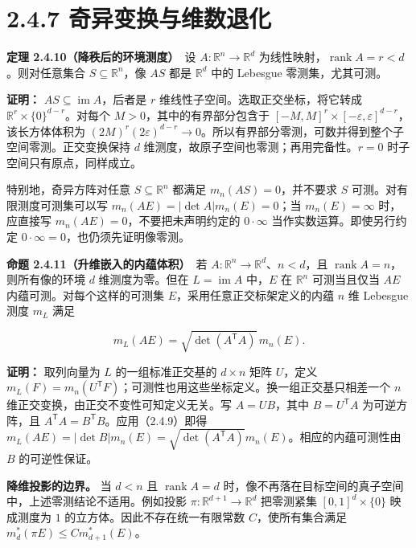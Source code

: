 \documentclass[11pt,a4paper]{article}
\begin{document}
\section[\S{}2.4.7
奇异变换与维数退化]{2.4.7
奇异变换与维数退化}\label{ux5947ux5f02ux53d8ux6362ux4e0eux7ef4ux6570ux9000ux5316}

\textbf{定理 2.4.10（降秩后的环境测度）}　设
\(A:\mathbb R^n\to\mathbb R^d\)
为线性映射，\(\operatorname{rank}A=r<d\)。则对任意集合
\(S\subseteq\mathbb R^n\)，像 \(AS\) 都是 \(\mathbb R^d\) 中的 Lebesgue
零测集，尤其可测。

\textbf{证明：} \(AS\subseteq\operatorname{im}A\)，后者是 \(r\)
维线性子空间。选取正交坐标，将它转成
\(\mathbb R^r\times\{0\}^{d-r}\)。对每个 \(M>0\)，其中的有界部分包含于
\([-M,M]^r\times[-\varepsilon,\varepsilon]^{d-r}\)，该长方体体积为
\((2M)^r(2\varepsilon)^{d-r}\to0\)。所以有界部分零测，可数并得到整个子空间零测。正交变换保持
\(d\) 维测度，故原子空间也零测；再用完备性。\(r=0\)
时子空间只有原点，同样成立。

特别地，奇异方阵对任意 \(S\subseteq\mathbb R^n\) 都满足
\(m_n(AS)=0\)，并不要求 \(S\) 可测。对有限测度可测集可以写
\(m_n(AE)=|\det A|m_n(E)=0\)；当 \(m_n(E)=\infty\) 时，应直接写
\(m_n(AE)=0\)，不要把未声明约定的 \(0\cdot\infty\)
当作实数运算。即使另行约定 \(0\cdot\infty=0\)，也仍须先证明像零测。

\textbf{命题 2.4.11（升维嵌入的内蕴体积）}　若
\(A:\mathbb R^n\to\mathbb R^d\)、\(n<d\)，且
\(\operatorname{rank}A=n\)，则所有像的环境 \(d\) 维测度为零。但在
\(L=\operatorname{im}A\) 中，\(E\) 在 \(\mathbb R^n\) 可测当且仅当
\(AE\) 内蕴可测。对每个这样的可测集 \(E\)，采用任意正交标架定义的内蕴
\(n\) 维 Lebesgue 测度 \(m_L\) 满足

\begin{equation*}
m_L(AE)=\sqrt{\det(A^{\mathsf T}A)}\,m_n(E).
\tag{2.4.16}
\end{equation*}

\textbf{证明：} 取列向量为 \(L\) 的一组标准正交基的 \(d\times n\) 矩阵
\(U\)，定义
\(m_L(F)=m_n(U^{\mathsf T}F)\)；可测性也用这些坐标定义。换一组正交基只相差一个
\(n\) 维正交变换，由正交不变性可知定义无关。写 \(A=UB\)，其中
\(B=U^{\mathsf T}A\) 为可逆方阵，且
\(A^{\mathsf T}A=B^{\mathsf T}B\)。应用（2.4.9）即得
\(m_L(AE)=|\det B|m_n(E)=\sqrt{\det(A^{\mathsf T}A)}m_n(E)\)。相应的内蕴可测性由
\(B\) 的可逆性保证。

\textbf{降维投影的边界。} 当 \(d<n\) 且 \(\operatorname{rank}A=d\)
时，像不再落在目标空间的真子空间中，上述零测结论不适用。例如投影
\(\pi:\mathbb R^{d+1}\to\mathbb R^d\) 把零测紧集 \([0,1]^d\times\{0\}\)
映成测度为 \(1\) 的立方体。因此不存在统一有限常数 \(C\)，使所有集合满足
\(m_d^*(\pi E)\le C m_{d+1}^*(E)\)。
\end{document}
